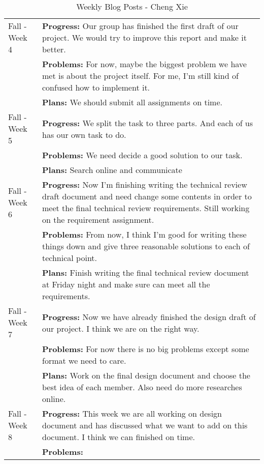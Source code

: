 \begin{longtable}[ht]{| p{1.5cm} | p{13.5cm} |}
    \caption{Weekly Blog Posts - Cheng Xie}
     \\\hline
     Fall - Week 4 &
     \textbf{Progress:}
     Our group has finished the first draft of our project.
     We would try to improve this report and make it better.
     \\ & \textbf{Problems:}
     For now, maybe the biggest problem we have met is about the project itself.
     For me, I'm still kind of confused how to implement it.
     \\ & \textbf{Plans:}
     We should submit all assignments on time.
     \\
     \hline
     Fall - Week 5 &
     \textbf{Progress:}
     We split the task to three parts.
     And each of us has our own task to do.
     \\ & \textbf{Problems:}
     We need decide a good solution to our task.
     \\ & \textbf{Plans:}
     Search online and communicate 
     \\
     \hline
     Fall - Week 6 &
     \textbf{Progress:}
     Now I'm finishing writing the technical review draft document and need change some contents in order to meet the final technical review requirements.
     Still working on the requirement assignment.
     \\ & \textbf{Problems:}
     From now, I think I'm good for writing these things down and give three reasonable solutions to each of technical point.
     \\ & \textbf{Plans:}
     Finish writing the final technical review document at Friday night and make sure can meet all the requirements.
     \\
     \hline
     Fall - Week 7 &
     \textbf{Progress:}
     Now we have already finished the design draft of our project.
     I think we are on the right way.
     \\ & \textbf{Problems:}
     For now there is no big problems except some format we need to care.
     \\ & \textbf{Plans:}
     Work on the final design document and choose the best idea of each member.
     Also need do more researches online.
     \\
     \hline
     Fall - Week 8 &
     \textbf{Progress:}
     This week we are all working on design document and has discussed what we want to add on this document.
     I think we can finished on time.
     \\ & \textbf{Problems:}

\end{longtable}
